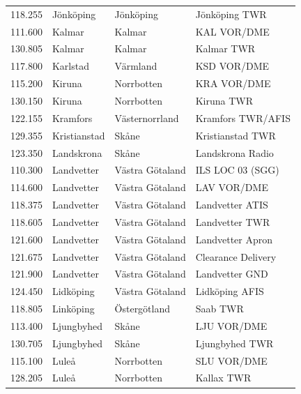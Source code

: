 \begin{longtable}{rlll}
  118.255 & Jönköping    & Jönköping       & Jönköping TWR                   \\
  111.600 & Kalmar       & Kalmar          & KAL VOR/DME                     \\
  130.805 & Kalmar       & Kalmar          & Kalmar TWR                      \\
  117.800 & Karlstad     & Värmland        & KSD VOR/DME                     \\
  115.200 & Kiruna       & Norrbotten      & KRA VOR/DME                     \\
  130.150 & Kiruna       & Norrbotten      & Kiruna TWR                      \\
  122.155 & Kramfors     & Västernorrland  & Kramfors TWR/AFIS               \\
  129.355 & Kristianstad & Skåne           & Kristianstad TWR                \\
  123.350 & Landskrona   & Skåne           & Landskrona Radio                \\
  110.300 & Landvetter   & Västra Götaland & ILS LOC 03 (SGG)                \\
  114.600 & Landvetter   & Västra Götaland & LAV VOR/DME                     \\
  118.375 & Landvetter   & Västra Götaland & Landvetter ATIS                 \\
  118.605 & Landvetter   & Västra Götaland & Landvetter TWR                  \\
  121.600 & Landvetter   & Västra Götaland & Landvetter Apron                \\
  121.675 & Landvetter   & Västra Götaland & Clearance Delivery              \\
  121.900 & Landvetter   & Västra Götaland & Landvetter GND                  \\
  124.450 & Lidköping    & Västra Götaland & Lidköping AFIS                  \\
  118.805 & Linköping    & Östergötland    & Saab TWR                        \\
  113.400 & Ljungbyhed   & Skåne           & LJU VOR/DME                     \\
  130.705 & Ljungbyhed   & Skåne           & Ljungbyhed TWR                  \\
  115.100 & Luleå        & Norrbotten      & SLU VOR/DME                     \\
  128.205 & Luleå        & Norrbotten      & Kallax TWR                      \\

\end{longtable}
